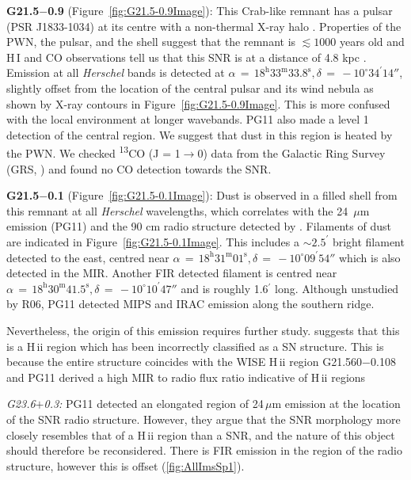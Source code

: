 \documentclass[fleqn,usenatbib]{mnras}
\begin{document}
{\textbf{G21.5$-$0.9} (Figure~\ref{fig:G21.5-0.9Image}): This Crab-like remnant has a pulsar (PSR J1833-1034) at its centre with a non-thermal X-ray halo \citep{Camilo2005}. Properties of the PWN, the pulsar, and the shell suggest that the remnant is $\lesssim1000$ years old  \citep{Camilo2005} and H\,{\small I} and CO observations tell us that this SNR is at a distance of 4.8 kpc \citep{Tian2008}.
Emission at all \textit{Herschel} bands is detected at $\alpha\,=\,18^\text{h}33^\text{m}33.8^\text{s}, \delta\,=\,-10^\circ34^\prime14''$, slightly offset from the location of the central pulsar and its wind nebula as shown by X-ray contours in Figure~\ref{fig:G21.5-0.9Image}. This is more confused with the local environment at longer wavebands. PG11 also made a level 1 detection of the central region. We suggest that dust in this region is heated by the PWN. We checked \textsuperscript{13}CO (J = 1$\rightarrow$0) data from the Galactic Ring Survey (GRS, \cite{Jackson2006}) and found no CO detection towards the SNR.
\bigskip

\textbf{G21.5$-$0.1} (Figure~\ref{fig:G21.5-0.1Image}): Dust is observed in a filled shell from this remnant at all \textit{Herschel} wavelengths, which correlates with the 24~$\mu$m emission (PG11) and the 90 cm radio structure detected by \citet{Brogan2006}. Filaments of dust are indicated in Figure~\ref{fig:G21.5-0.1Image}. This includes a $\sim2.5^\prime$ bright filament detected to the east, centred near $\alpha\,=\,18^\text{h}31^\text{m}01^\text{s}, \delta\,=\,-10^\circ09^\prime54''$ which is also detected in the MIR. Another FIR detected filament is centred near $\alpha\,=\,18^\text{h}30^\text{m}41.5^\text{s}, \delta\,=\,-10^\circ10^\prime47''$ and is roughly 1.6$^\prime$ long. Although unstudied by R06, PG11 detected MIPS and IRAC emission along the southern ridge.

Nevertheless, the origin of this emission requires further study.
\citet{Anderson2017} suggests that this is a H\,{\sc ii} region which has been incorrectly classified as a SN structure.
This is because the entire structure coincides with the WISE H\,{\sc ii} region G21.560$-$0.108 and PG11 derived a high MIR to radio flux ratio indicative of H\,{\sc ii} regions
\bigskip

\textit{G23.6$+$0.3:} PG11 detected an elongated region of 24\,$\mu$m emission at the location of the SNR radio structure. However, they argue that the SNR morphology more closely resembles that of a H\,{\sc ii} region than a SNR, and the nature of this object should therefore be reconsidered.
There is FIR emission in the region of the radio structure, however this is offset (\ref{fig:AllImsSp1}).
\bigskip

}
\end{document}
